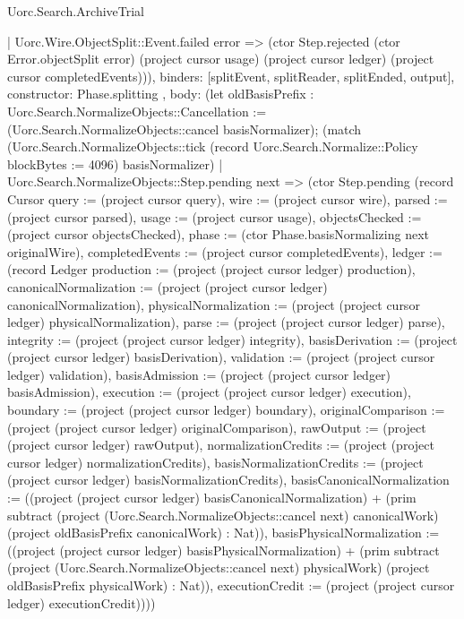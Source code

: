 \begin{lexlean}{Uorc.Search.ArchiveTrial}
\begin{semanticmodule}
{{{          | Uorc.Wire.ObjectSplit::Event.failed error => (ctor Step.rejected (ctor Error.objectSplit error) (project cursor usage) (project cursor ledger) (project cursor completedEvents))),
        binders: [splitEvent, splitReader, splitEnded, output],
        constructor: Phase.splitting
      },
      {
        body: (let oldBasisPrefix : Uorc.Search.NormalizeObjects::Cancellation := (Uorc.Search.NormalizeObjects::cancel basisNormalizer); (match (Uorc.Search.NormalizeObjects::tick (record Uorc.Search.Normalize::Policy {blockBytes := 4096}) basisNormalizer)
          | Uorc.Search.NormalizeObjects::Step.pending next => (ctor Step.pending (record Cursor {query := (project cursor query), wire := (project cursor wire), parsed := (project cursor parsed), usage := (project cursor usage), objectsChecked := (project cursor objectsChecked), phase := (ctor Phase.basisNormalizing next originalWire), completedEvents := (project cursor completedEvents), ledger := (record Ledger {production := (project (project cursor ledger) production), canonicalNormalization := (project (project cursor ledger) canonicalNormalization), physicalNormalization := (project (project cursor ledger) physicalNormalization), parse := (project (project cursor ledger) parse), integrity := (project (project cursor ledger) integrity), basisDerivation := (project (project cursor ledger) basisDerivation), validation := (project (project cursor ledger) validation), basisAdmission := (project (project cursor ledger) basisAdmission), execution := (project (project cursor ledger) execution), boundary := (project (project cursor ledger) boundary), originalComparison := (project (project cursor ledger) originalComparison), rawOutput := (project (project cursor ledger) rawOutput), normalizationCredits := (project (project cursor ledger) normalizationCredits), basisNormalizationCredits := (project (project cursor ledger) basisNormalizationCredits), basisCanonicalNormalization := ((project (project cursor ledger) basisCanonicalNormalization) + (prim subtract (project (Uorc.Search.NormalizeObjects::cancel next) canonicalWork) (project oldBasisPrefix canonicalWork) : Nat)), basisPhysicalNormalization := ((project (project cursor ledger) basisPhysicalNormalization) + (prim subtract (project (Uorc.Search.NormalizeObjects::cancel next) physicalWork) (project oldBasisPrefix physicalWork) : Nat)), executionCredit := (project (project cursor ledger) executionCredit)})}))
}}}
\end{semanticmodule}
\end{lexlean}
